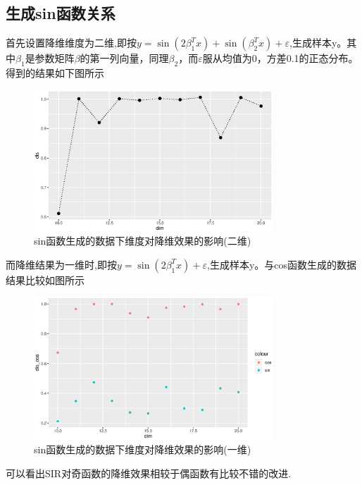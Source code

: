 \subsection{生成sin函数关系}

首先设置降维维度为二维,即按$y=\sin(2\beta_1^Tx)+\sin(\beta_2^Tx)+\varepsilon$,生成样本y。其中$\beta_1$是参数矩阵$\beta$的第一列向量，同理$\beta_2$，而$\varepsilon$服从均值为0，方差0.1的正态分布。得到的结果如下图所示
    \begin{figure}[H]
        \centering
        \includegraphics[width=0.8\textwidth]{image/sin_sir.eps}
        \caption{sin函数生成的数据下维度对降维效果的影响(二维)}
    \end{figure}

而降维结果为一维时,即按$y=\sin(2\beta_1^Tx)+\varepsilon$,生成样本y。与cos函数生成的数据结果比较如图所示
\begin{figure}[H]
    \centering
    \includegraphics[width=0.8\textwidth]{image/compare_sir.eps}
    \caption{sin函数生成的数据下维度对降维效果的影响(一维)}
\end{figure}
可以看出SIR对奇函数的降维效果相较于偶函数有比较不错的改进.